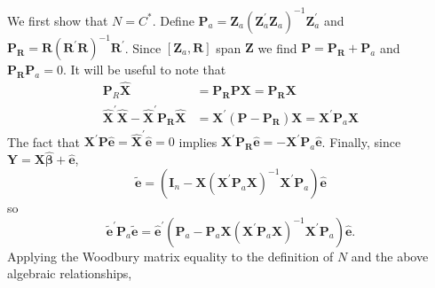 \documentclass[10pt]{article}
\begin{document}
We first show that $N=C^{*}$. Define $\boldsymbol{P}_{a}=\boldsymbol{Z}_{a}\left(\boldsymbol{Z}_{a}^{\prime} \boldsymbol{Z}_{a}\right)^{-1} \boldsymbol{Z}_{a}^{\prime}$ and $\boldsymbol{P}_{\boldsymbol{R}}=\boldsymbol{R}\left(\boldsymbol{R}^{\prime} \boldsymbol{R}\right)^{-1} \boldsymbol{R}^{\prime}$. Since $\left[\boldsymbol{Z}_{a}, \boldsymbol{R}\right]$ span $\boldsymbol{Z}$ we find $\boldsymbol{P}=\boldsymbol{P}_{\boldsymbol{R}}+\boldsymbol{P}_{a}$ and $\boldsymbol{P}_{\boldsymbol{R}} \boldsymbol{P}_{a}=0$. It will be useful to note that
$$
\begin{aligned}
\boldsymbol{P}_{R} \widehat{\boldsymbol{X}} &=\boldsymbol{P}_{\boldsymbol{R}} \boldsymbol{P} \boldsymbol{X}=\boldsymbol{P}_{\boldsymbol{R}} \boldsymbol{X} \\
\widehat{\boldsymbol{X}}^{\prime} \widehat{\boldsymbol{X}}-\widehat{\boldsymbol{X}}^{\prime} \boldsymbol{P}_{\boldsymbol{R}} \widehat{\boldsymbol{X}} &=\boldsymbol{X}^{\prime}\left(\boldsymbol{P}-\boldsymbol{P}_{\boldsymbol{R}}\right) \boldsymbol{X}=\boldsymbol{X}^{\prime} \boldsymbol{P}_{a} \boldsymbol{X}
\end{aligned}
$$
The fact that $\boldsymbol{X}^{\prime} \boldsymbol{P} \widehat{\boldsymbol{e}}=\widehat{\boldsymbol{X}}^{\prime} \widehat{\boldsymbol{e}}=0$ implies $\boldsymbol{X}^{\prime} \boldsymbol{P}_{\boldsymbol{R}} \widehat{\boldsymbol{e}}=-\boldsymbol{X}^{\prime} \boldsymbol{P}_{a} \widehat{\boldsymbol{e}}$. Finally, since $\boldsymbol{Y}=\boldsymbol{X} \widehat{\boldsymbol{\beta}}+\widehat{\boldsymbol{e}}$,
$$
\widetilde{\boldsymbol{e}}=\left(\boldsymbol{I}_{n}-\boldsymbol{X}\left(\boldsymbol{X}^{\prime} \boldsymbol{P}_{a} \boldsymbol{X}\right)^{-1} \boldsymbol{X}^{\prime} \boldsymbol{P}_{a}\right) \widehat{\boldsymbol{e}}
$$
so
$$
\widetilde{\boldsymbol{e}}^{\prime} \boldsymbol{P}_{a} \widetilde{\boldsymbol{e}}=\widehat{\boldsymbol{e}}^{\prime}\left(\boldsymbol{P}_{a}-\boldsymbol{P}_{a} \boldsymbol{X}\left(\boldsymbol{X}^{\prime} \boldsymbol{P}_{a} \boldsymbol{X}\right)^{-1} \boldsymbol{X}^{\prime} \boldsymbol{P}_{a}\right) \widehat{\boldsymbol{e}} .
$$
Applying the Woodbury matrix equality to the definition of $N$ and the above algebraic relationships,
\end{document}

